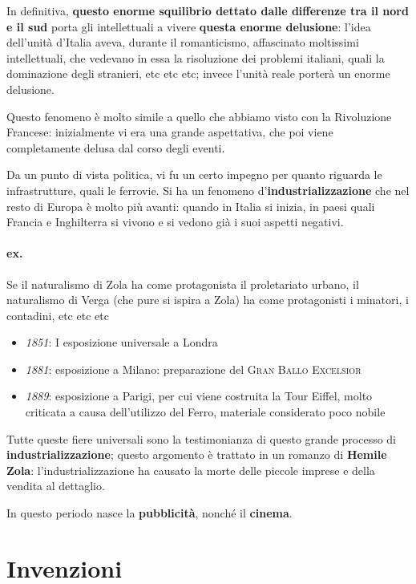 \documentclass{book}
\newcommand{\evidenziatore}[1]{\textbf{#1}}
\begin{document}
In definitiva,
\evidenziatore{questo enorme squilibrio dettato dalle differenze tra il nord e il sud}
porta gli intellettuali a vivere \textbf{questa enorme delusione}:
l'idea dell'unità d'Italia aveva, durante il romanticismo, affascinato
moltissimi intellettuali, che vedevano in essa la risoluzione dei
problemi italiani, quali la dominazione degli stranieri, etc etc etc;
invece l'unità reale porterà un enorme delusione.

Questo fenomeno è molto simile a quello che abbiamo visto con la
Rivoluzione Francese: inizialmente vi era una grande aspettativa, che
poi viene completamente delusa dal corso degli eventi.

Da un punto di vista politica, vi fu un certo impegno per quanto
riguarda le infrastrutture, quali le ferrovie. Si ha un fenomeno
d'\textbf{industrializzazione} che nel resto di Europa è molto più
avanti: quando in Italia si inizia, in paesi quali Francia e Inghilterra
si vivono e si vedono già i suoi aspetti negativi. 

\paragraph{ex.}Se il naturalismo di Zola ha come protagonista il proletariato urbano,
il naturalismo di Verga (che pure si ispira a Zola) ha come protagonisti
i minatori, i contadini, etc etc etc

\begin{itemize}

\item
  \emph{1851}: I esposizione universale a Londra
\item
  \emph{1881}: esposizione a Milano: preparazione del \textsc{Gran Ballo
  Excelsior}
\item
  \emph{1889}: esposizione a Parigi, per cui viene costruita la Tour
  Eiffel, molto criticata a causa dell'utilizzo del Ferro, materiale
  considerato poco nobile
\end{itemize}

Tutte queste fiere universali sono la testimonianza di questo grande
processo di \textbf{industrializzazione}; questo argomento è trattato in
un romanzo di \textbf{Hemile Zola}: l'industrializzazione ha causato la
morte delle piccole imprese e della vendita al dettaglio.

In questo periodo nasce la \textbf{pubblicità}, nonché il
\textbf{cinema}.

\section{Invenzioni}\
\end{document}
